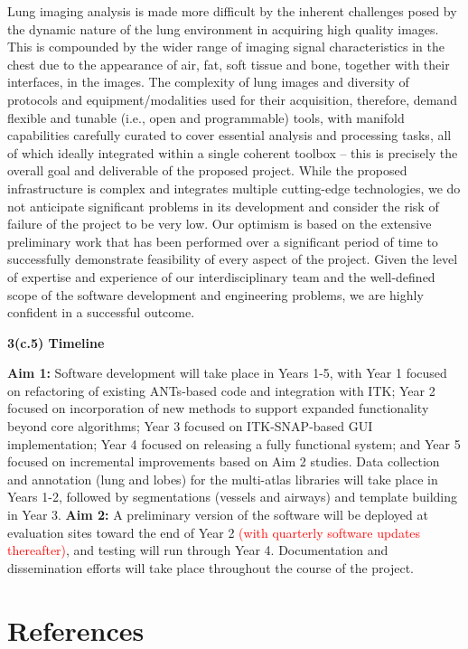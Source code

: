 \documentclass[11pt,]{article}
\begin{document}
Lung imaging analysis is made more difficult by the inherent challenges
posed by the dynamic nature of the lung environment in acquiring high
quality images. This is compounded by the wider range of imaging signal
characteristics in the chest due to the appearance of air, fat, soft
tissue and bone, together with their interfaces, in the images. The
complexity of lung images and diversity of protocols and
equipment/modalities used for their acquisition, therefore, demand
flexible and tunable (i.e., open and programmable) tools, with manifold
capabilities carefully curated to cover essential analysis and
processing tasks, all of which ideally integrated within a single
coherent toolbox -- this is precisely the overall goal and deliverable
of the proposed project. While the proposed infrastructure is complex
and integrates multiple cutting-edge technologies, we do not anticipate
significant problems in its development and consider the risk of failure
of the project to be very low. Our optimism is based on the extensive
preliminary work that has been performed over a significant period of
time to successfully demonstrate feasibility of every aspect of the
project. Given the level of expertise and experience of our
interdisciplinary team and the well-defined scope of the software
development and engineering problems, we are highly confident in a
successful outcome.

\textbf{3(c.5) Timeline}

\textbf{Aim 1:} Software development will take place in Years 1-5, with
Year 1 focused on refactoring of existing ANTs-based code and
integration with ITK; Year 2 focused on incorporation of new methods to
support expanded functionality beyond core algorithms; Year 3 focused on
ITK-SNAP-based GUI implementation; Year 4 focused on releasing a fully
functional system; and Year 5 focused on incremental improvements based
on Aim 2 studies. Data collection and annotation (lung and lobes) for
the multi-atlas libraries will take place in Years 1-2, followed by
segmentations (vessels and airways) and template building in Year 3.
\textbf{Aim 2:} A preliminary version of the software will be deployed
at evaluation sites toward the end of Year 2
\textcolor{red}{(with quarterly software updates thereafter)}, and
testing will run through Year 4. Documentation and dissemination efforts
will take place throughout the course of the project.

\clearpage

\newpage

\section*{References}\label{references}
\end{document}
